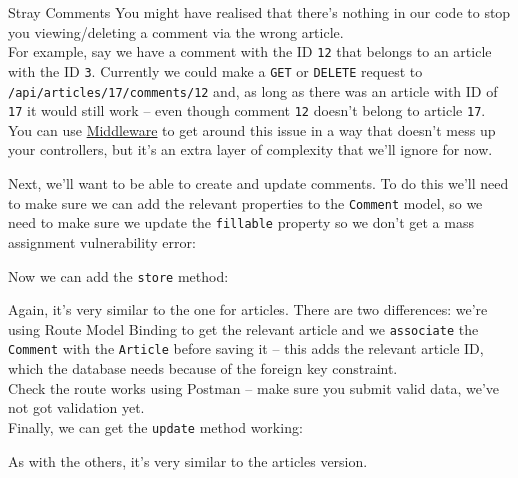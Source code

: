 \begin{infobox}{Stray Comments}
    You might have realised that there's nothing in our code to stop you viewing/deleting a comment via the wrong article.
    \\

    For example, say we have a comment with the ID \texttt{12} that belongs to an article with the ID \texttt{3}. Currently we could make a \texttt{GET} or \texttt{DELETE} request to \\ \texttt{/api/articles/17/comments/12} and, as long as there was an article with ID of \texttt{17} it would still work – even though comment \texttt{12} doesn't belong to article \texttt{17}.
    \\

    You can use \href{http://laravel.com/docs/master/middleware}{Middleware} to get around this issue in a way that doesn't mess up your controllers, but it's an extra layer of complexity that we'll ignore for now.
\end{infobox}

Next, we'll want to be able to create and update comments. To do this we'll need to make sure we can add the relevant properties to the \texttt{Comment} model, so we need to make sure we update the \texttt{fillable} property so we don't get a mass assignment vulnerability error:


Now we can add the \texttt{store} method:


Again, it's very similar to the one for articles. There are two differences: we're using Route Model Binding to get the relevant article and we \texttt{associate} the \texttt{Comment} with the \texttt{Article} before saving it – this adds the relevant article ID, which the database needs because of the foreign key constraint.
\\

Check the route works using Postman – make sure you submit valid data, we've not got validation yet.
\\

Finally, we can get the \texttt{update} method working:


As with the others, it's very similar to the articles version.
\\

